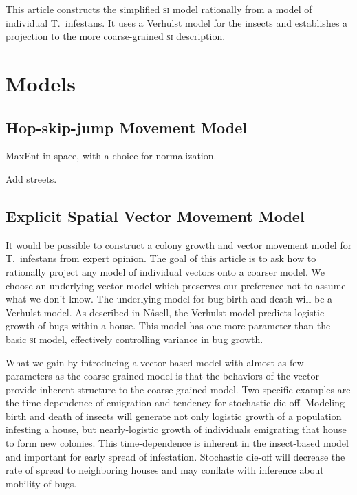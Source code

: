 \documentclass{article}
\begin{document}
This article constructs the simplified \textsc{si} model
rationally from a model of individual T.\ infestans. It uses
a Verhulst model for the insects and establishes a projection
to the more coarse-grained \textsc{si} description.


\section{Models}
\subsection{Hop-skip-jump Movement Model}
MaxEnt in space, with a choice for normalization.

Add streets.


\subsection{Explicit Spatial Vector Movement Model}
It would be possible to construct a colony growth and
vector movement model for T.\ infestans from expert opinion.
The goal of this article is to ask how to rationally project
any model of individual vectors onto a coarser model.
We choose an underlying vector model which preserves
our preference not to assume what we don't know.
The underlying model for bug birth and death will be
a Verhulst model. As described in N{\aa}sell\cite{Nasell2001},
the Verhulst model predicts logistic growth of bugs within
a house. This model has one more parameter than the
basic \textsc{si} model, effectively controlling variance in
bug growth.

What we gain by introducing a vector-based model with
almost as few parameters as the coarse-grained model is
that the behaviors of the vector provide inherent structure
to the coarse-grained model. Two specific examples
are the time-dependence of emigration and tendency for
stochastic die-off. Modeling birth
and death of insects will generate not only logistic
growth of a population infesting a house, but nearly-logistic
growth of individuals emigrating that house to form new
colonies. This time-dependence is inherent in the insect-based
model and important for early spread of infestation.
Stochastic die-off will decrease the rate of spread
to neighboring houses and may conflate with inference
about mobility of bugs.
\end{document}
